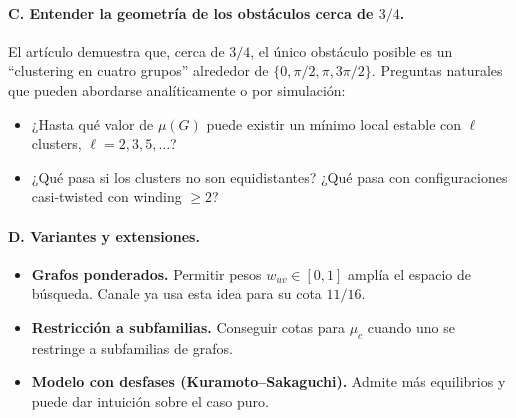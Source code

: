 \documentclass[11pt,a4paper]{article}
\begin{document}
\paragraph{C. Entender la geometría de los obstáculos cerca de $3/4$.}
El artículo \cite{lepsveridze-zhang} demuestra que, cerca de $3/4$, el único obstáculo posible es un ``clustering en cuatro grupos'' alrededor de $\{0,\pi/2,\pi,3\pi/2\}$. Preguntas naturales que pueden abordarse analíticamente o por simulación:
\begin{itemize}
    \item ¿Hasta qué valor de $\mu(G)$ puede existir un mínimo local estable con $\ell$ clusters, $\ell=2,3,5,\dots$?
    \item ¿Qué pasa si los clusters no son equidistantes? ¿Qué pasa con configuraciones casi-twisted con winding $\ge 2$?
\end{itemize}

\paragraph{D. Variantes y extensiones.}
\begin{itemize}
    \item \textbf{Grafos ponderados.} Permitir pesos $w_{uv}\in[0,1]$ amplía el espacio de búsqueda. Canale \cite{canale2022} ya usa esta idea para su cota $11/16$.
      \item \textbf{Restricción a subfamilias.} Conseguir cotas para $\mu_c$ cuando uno se restringe a subfamilias de grafos.
    \item \textbf{Modelo con desfases (Kuramoto–Sakaguchi).} Admite más equilibrios y puede dar intuición sobre el caso puro.
\end{itemize}
\end{document}
